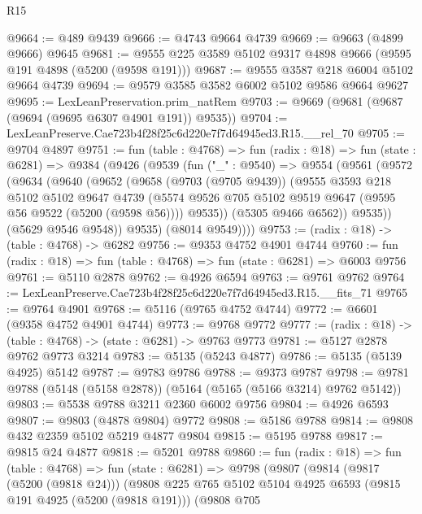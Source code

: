 \begin{lexlean}{R15}
\begin{coremodule}
{{{{{{{{{{{@9664 := @489 @9439
@9666 := @4743 @9664 @4739
@9669 := @9663 (@4899 @9666) @9645
@9681 := @9555 @225 @3589 @5102 @9317 @4898 @9666 (@9595 @191 @4898 (@5200 (@9598 @191)))
@9687 := @9555 @3587 @218 @6004 @5102 @9664 @4739
@9694 := @9579 @3585 @3582 @6002 @5102 @9586 @9664 @9627
@9695 := LexLeanPreservation.prim_natRem
@9703 := @9669 (@9681 (@9687 (@9694 (@9695 @6307 @4901 @191)) @9535))
@9704 := LexLeanPreserve.Cae723b4f28f25c6d220e7f7d64945ed3.R15.__rel_70
@9705 := @9704 @4897
@9751 := fun (table : @4768) =>
  fun (radix : @18) =>
  fun (state : @6281) =>
  @9384
    (@9426
      (@9539
        (fun ("_" : @9540) =>
        @9554
          (@9561
            (@9572
              (@9634
                (@9640
                  (@9652
                    (@9658
                      (@9703 (@9705 @9439))
                      (@9555
                        @3593
                        @218
                        @5102
                        @5102
                        @9647
                        @4739
                        (@5574 @9526 @705 @5102 @9519 @9647 (@9595 @56 @9522 (@5200 (@9598 @56))))
                        @9535))
                    (@5305 @9466 @6562))
                  @9535))
              (@5629 @9546 @9548))
            @9535)
          (@8014 @9549))))
@9753 := (radix : @18) -> (table : @4768) -> @6282
@9756 := @9353 @4752 @4901 @4744
@9760 := fun (radix : @18) => fun (table : @4768) => fun (state : @6281) => @6003 @9756
@9761 := @5110 @2878
@9762 := @4926 @6594
@9763 := @9761 @9762
@9764 := LexLeanPreserve.Cae723b4f28f25c6d220e7f7d64945ed3.R15.__fits_71
@9765 := @9764 @4901
@9768 := @5116 (@9765 @4752 @4744)
@9772 := @6601 (@9358 @4752 @4901 @4744)
@9773 := @9768 @9772
@9777 := (radix : @18) -> (table : @4768) -> (state : @6281) -> @9763 @9773
@9781 := @5127 @2878 @9762 @9773 @3214
@9783 := @5135 (@5243 @4877)
@9786 := @5135 (@5139 @4925) @5142
@9787 := @9783 @9786
@9788 := @9373 @9787
@9798 := @9781 @9788 (@5148 (@5158 @2878)) (@5164 (@5165 (@5166 @3214) @9762 @5142))
@9803 := @5538 @9788 @3211 @2360 @6002 @9756
@9804 := @4926 @6593
@9807 := @9803 (@4878 @9804) @9772
@9808 := @5186 @9788
@9814 := @9808 @432 @2359 @5102 @5219 @4877 @9804
@9815 := @5195 @9788
@9817 := @9815 @24 @4877
@9818 := @5201 @9788
@9860 := fun (radix : @18) =>
  fun (table : @4768) =>
  fun (state : @6281) =>
  @9798
    (@9807
      (@9814
        (@9817 (@5200 (@9818 @24)))
        (@9808
          @225
          @765
          @5102
          @5104
          @4925
          @6593
          (@9815 @191 @4925 (@5200 (@9818 @191)))
          (@9808
            @705
}}}}}}}}}}}
\end{coremodule}
\end{lexlean}

